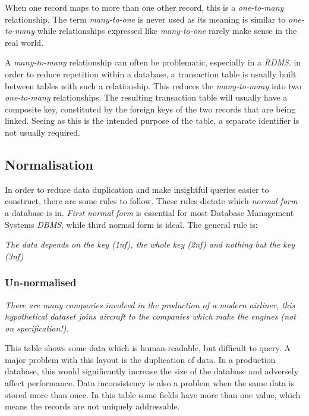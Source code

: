 \documentclass[10pt]{article}
\begin{document}
When one record maps to more than one other record, this is a \emph{one-to-many} relationship. The term \emph{many-to-one} is never used as its meaning is similar to \emph{one-to-many} while relationships expressed like \emph{many-to-one} rarely make sense in the real world.

A \emph{many-to-many} relationship can often be problematic, especially in a \emph{RDMS}. in order to reduce repetition within a database, a transaction table is usually built between tables with such a relationship. This reduces the \emph{many-to-many} into two \emph{one-to-many} relationships. The resulting transaction table will usually have a composite key, constituted by the foreign keys of the two records that are being linked. Seeing as this is the intended purpose of the table, a separate identifier is not usually required.

\subsection{Normalisation}
\label{sec:orga859883}

In order to reduce data duplication and make insightful queries easier to construct, there are some rules to follow. These rules dictate which \emph{normal form} a database is in. \emph{First normal form} is essential for most Database Management Systems \emph{DBMS}, while third normal form is ideal. The general rule is:

\emph{The data depends on the key (1nf), the whole key (2nf) and nothing but the key (3nf)}

\subsubsection{Un-normalised}
\label{sec:org3153c19}

\emph{There are many companies involved in the production of a modern airliner, this hypothetical dataset joins aircraft to the companies which make the engines (not on specification!).}

This table shows some data which is human-readable, but difficult to query. A major problem with this layout is the duplication of data. In a production database, this would significantly increase the size of the database and adversely affect performance. Data inconsistency is also a problem when the same data is stored more than once. In this table some fields have more than one value, which means the records are not uniquely addressable.
\end{document}
